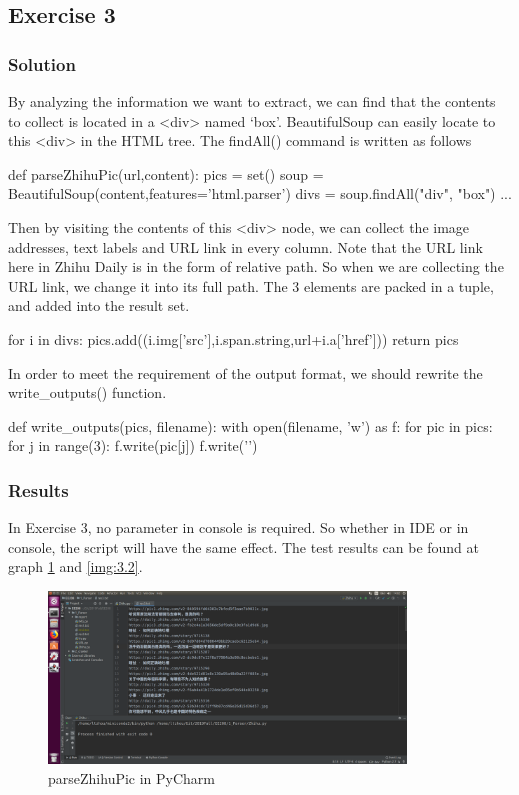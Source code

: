 \documentclass{article}
\begin{document}
\subsection{Exercise 3}

\subsubsection{Solution}

By analyzing the information we want to extract, we can find that the contents to collect is located in a <div> named `box'. BeautifulSoup can easily locate to this <div> in the HTML tree. The findAll() command is written as follows

\begin{python}
def parseZhihuPic(url,content):
    pics = set()
    soup = BeautifulSoup(content,features='html.parser')
    divs = soup.findAll("div", "box")
    ...
\end{python}

Then by visiting the contents of this <div> node, we can collect the image addresses, text labels and URL link in every column. Note that the URL link here in Zhihu Daily is in the form of relative path. So when we are collecting the URL link, we change it into its full path. The 3 elements are packed in a tuple, and added into the result set.
\begin{python}
    for i in divs:
        pics.add((i.img['src'],i.span.string,url+i.a['href']))
    return pics
\end{python} 

In order to meet the requirement of the output format, we should rewrite the write\_outputs() function.
\begin{python}
def write_outputs(pics, filename):
    with open(filename, 'w') as f:
        for pic in pics:
            for j in range(3):
                f.write(pic[j])
                f.write('\n')
\end{python}

\subsubsection{Results}

In Exercise 3, no parameter in console is required. So whether in IDE or in console, the script will have the same effect. The test results can be found at graph \ref{img:3.1} and \ref{img:3.2}.

\begin{figure}[htbp]
\centering
\includegraphics[width=9.5cm]{img/test3_1.png}
\caption{parseZhihuPic in PyCharm}
\label{img:3.1}
\end{figure}
\end{document}
